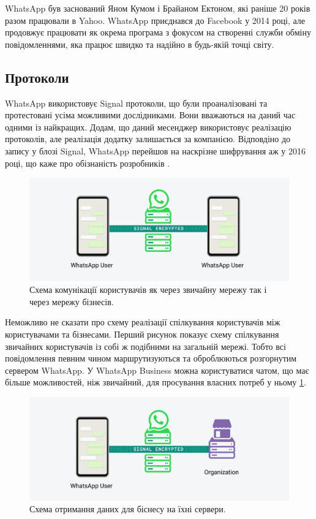 WhatsApp був заснований Яном Кумом і Брайаном Ектоном, які раніше 20 років разом працювали в Yahoo. WhatsApp приєднався до Facebook у 2014 році, але продовжує працювати як окрема програма з фокусом на створенні служби обміну повідомленнями, яка працює швидко та надійно в будь-якій точці світу.

\subsection{Протоколи}

WhatsApp використовує Signal протоколи, що були проаналізовані та протестовані усіма можливими дослідниками. Вони вважаються на даний час одними із найкращих. Додам, що даний месенджер використовує реалізацію протоколів, але реалізація додатку залишається за компанією. Відповдіно до запису у блозі Signal, WhatsApp перейшов на наскрізне шифрування аж у 2016 році, що каже про обізнаність розробників \cite{moxie02016whatsapp}.


\begin{figure}[ht!]
        \centering
        \includegraphics[scale=0.37]{../IMAGES/whatsapp_ordinary_comunication.png}
        \caption{Схема комунікації користувачів як через звичайну мережу так і через мережу бізнесів.}
        \label{whatsapp_ordinary_communication}
\end{figure}

Неможливо не сказати про схему реалізації спілкування користувачів між користувачами та бізнесами. Перший рисунок показує схему спілкування звичайних користувачів із собі ж подібними на загальній мережі. Тобто всі повідомлення певним чином маршрутизуються та оброблюються розгорнутим сервером WhatsApp. У WhatsApp Business можна користуватися чатом, що має більше можливостей, ніж звичайний, для просування власних потреб у ньому \ref{whatsapp_ordinary_communication}. 

\begin{figure}[ht!]
        \centering
        \includegraphics[scale=0.37]{../IMAGES/whatsapp_organization_communication.png}
        \caption{Схема отримання даних для біснесу на їхні сервери.}
        \label{whatsapp_organization_communication}
\end{figure}

